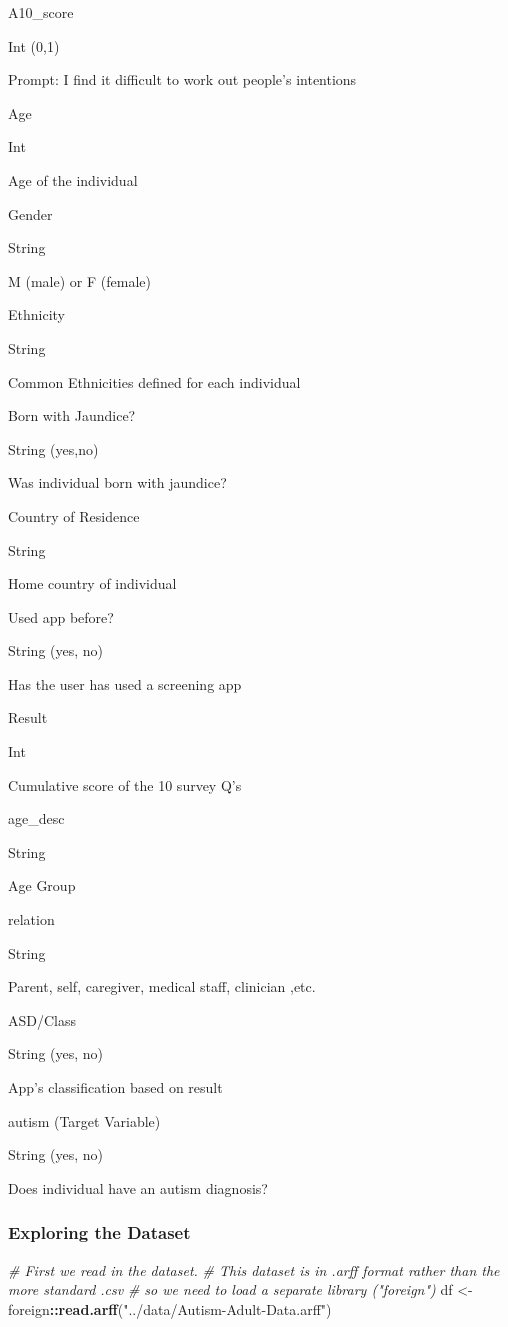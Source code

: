 \documentclass[]{article}
\newenvironment{Shaded}{\begin{snugshade}}{\end{snugshade}}
\newcommand{\CommentTok}[1]{\textcolor[rgb]{0.56,0.35,0.01}{\textit{#1}}}
\newcommand{\KeywordTok}[1]{\textcolor[rgb]{0.13,0.29,0.53}{\textbf{#1}}}
\newcommand{\NormalTok}[1]{#1}
\newcommand{\OperatorTok}[1]{\textcolor[rgb]{0.81,0.36,0.00}{\textbf{#1}}}
\newcommand{\StringTok}[1]{\textcolor[rgb]{0.31,0.60,0.02}{#1}}
\begin{document}
A10\_score

Int (0,1)

Prompt: I find it difficult to work out people's intentions

Age

Int

Age of the individual

Gender

String

M (male) or F (female)

Ethnicity

String

Common Ethnicities defined for each individual

Born with Jaundice?

String (yes,no)

Was individual born with jaundice?

Country of Residence

String

Home country of individual

Used app before?

String (yes, no)

Has the user has used a screening app

Result

Int

Cumulative score of the 10 survey Q's

age\_desc

String

Age Group

relation

String

Parent, self, caregiver, medical staff, clinician ,etc.

ASD/Class

String (yes, no)

App's classification based on result

autism (Target Variable)

String (yes, no)

Does individual have an autism diagnosis?

\hypertarget{exploring-the-dataset}{%
\subsubsection{Exploring the Dataset}\label{exploring-the-dataset}}

\begin{Shaded}
\begin{Highlighting}[]
\CommentTok{# First we read in the dataset.}
\CommentTok{# This dataset is in .arff format rather than the more standard .csv}
\CommentTok{# so we need to load a separate library ("foreign")}
\NormalTok{df <-}\StringTok{ }\NormalTok{foreign}\OperatorTok{::}\KeywordTok{read.arff}\NormalTok{(}\StringTok{"../data/Autism-Adult-Data.arff"}\NormalTok{)}
\end{Highlighting}
\end{Shaded}
\end{document}
